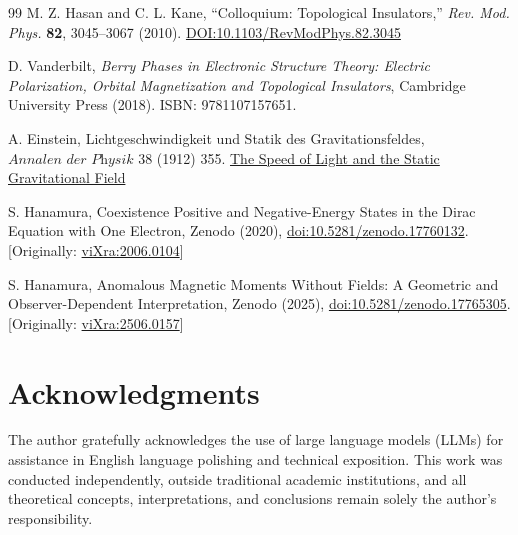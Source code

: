 \documentclass[%
 reprint,
 amsmath,amssymb,
 aps,
]{revtex4-1}
\numberwithin{equation}{section}%
\begin{document}
\begin{thebibliography}{99}
M. Z. Hasan and C. L. Kane, ``Colloquium: Topological Insulators,'' \textit{Rev. Mod. Phys.} \textbf{82}, 3045–3067 (2010). \href{https://doi.org/10.1103/RevModPhys.82.3045}{DOI:10.1103/RevModPhys.82.3045}

D. Vanderbilt, \textit{Berry Phases in Electronic Structure Theory: Electric Polarization, Orbital Magnetization and Topological Insulators}, Cambridge University Press (2018). ISBN: 9781107157651.

A. Einstein, Lichtgeschwindigkeit und Statik des Gravitationsfeldes, $\textit{Annalen der Physik}$ 38 (1912) 355. \href{http://myweb.rz.uni-augsburg.de/~eckern/adp/history/einstein-papers/1912_38_355-369.pdf}{The Speed of Light and the Static Gravitational Field}

S. Hanamura, Coexistence Positive and Negative-Energy States in the Dirac Equation with One Electron, Zenodo (2020), \href{https://doi.org/10.5281/zenodo.17760132}{doi:10.5281/zenodo.17760132}. [Originally: \href{https://vixra.org/abs/2006.0104}{viXra:2006.0104}]

S. Hanamura, Anomalous Magnetic Moments Without Fields: A Geometric and Observer-Dependent Interpretation, Zenodo (2025), \href{https://doi.org/10.5281/zenodo.17765305}{doi:10.5281/zenodo.17765305}. [Originally: \href{https://vixra.org/abs/2506.0157}{viXra:2506.0157}]

\end{thebibliography}


\section*{Acknowledgments}
The author gratefully acknowledges the use of large language models (LLMs) for assistance in English language polishing and technical exposition. This work was conducted independently, outside traditional academic institutions, and all theoretical concepts, interpretations, and conclusions remain solely the author’s responsibility.
\end{document}
